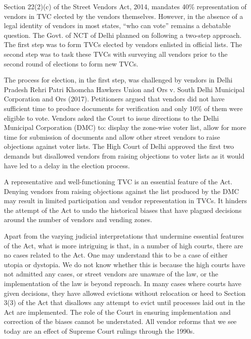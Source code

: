 \documentclass[a4paper, 12pt, twoside]{article}
\begin{document}
Section 22(2)(c) of the Street Vendors Act, 2014, mandates 40\% representation of vendors in TVC elected by the vendors themselves. However, in the absence of a legal identity of vendors in most states, “who can vote” remains a debatable question. 
The Govt. of NCT of Delhi planned on following a two-step approach. The first step was to form TVCs elected by vendors enlisted in official lists. The second step was to task these TVCs with surveying all vendors prior to the second round of elections to form new TVCs. 

The process for election, in the first step, was challenged by vendors in Delhi Pradesh Rehri Patri Khomcha Hawkers Union and Ors v. South Delhi Municipal Corporation and Ors (2017). Petitioners argued that vendors did not have sufficient time to produce documents for verification and only 10\% of them were eligible to vote. Vendors asked the Court to issue directions to the Delhi Municipal Corporation (DMC) to: display the zone-wise voter list, allow for more time for submission of documents and allow other street vendors to raise objections against voter lists. The High Court of Delhi approved the first two demands but disallowed vendors from raising objections to voter lists as it would have led to a delay in the election process. 

A representative and well-functioning TVC is an essential feature of the Act. Denying vendors from raising objections against the list produced by the DMC may result in limited participation and vendor representation in TVCs. It hinders the attempt of the Act to undo the historical biases that have plagued decisions around the number of vendors and vending zones.

Apart from the varying judicial interpretations that undermine essential features of the Act, what is more intriguing is that, in a number of high courts, there are no cases related to the Act. One may understand this to be a case of either utopia or dystopia. We do not know whether this is because the high courts have not admitted any cases, or street vendors are unaware of the law, or the implementation of the law is beyond reproach. In many cases where courts have given decisions, they have allowed evictions without relocation or heed to Section 3(3) of the Act that disallows any attempt to evict until processes laid out in the Act are implemented. The role of the Court in ensuring implementation and correction of the biases cannot be understated. All vendor reforms that we see today are an effect of Supreme Court rulings through the 1990s. 
\end{document}
